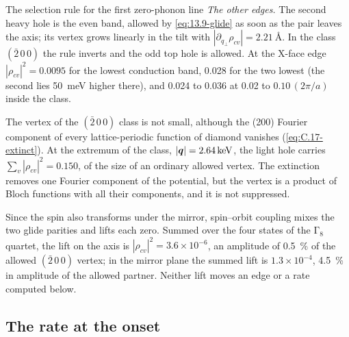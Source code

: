 \begin{workedexample}{The selection rule for the first zero-phonon line}
\emph{The other edges.} The second heavy hole is the even band, allowed by \cref{eq:13.9-glide} as soon as the pair leaves the axis; its vertex grows linearly in the tilt with $|\partial_{q_\perp}\rho_{cv}| = \SI{2.21}{\angstrom}$. In the class $(\bar2\,0\,0)$ the rule inverts and the odd top hole is allowed. At the X-face edge $|\rho_{cv}|^2 = 0.0095$ for the lowest conduction band, 0.028 for the two lowest (the second lies \SI{50}{meV} higher there), and 0.024 to 0.036 at 0.02 to $0.10\,(2\pi/a)$ inside the class.
\end{workedexample}

The vertex of the $(\bar2\,0\,0)$ class is not small, although the (200) Fourier component of every lattice-periodic function of diamond vanishes (\cref{eq:C.17-extinct}). At the extremum of the class, $|\bm{q}| = \SI{2.64}{keV}$, the light hole carries $\sum_v|\rho_{cv}|^2 = 0.150$, of the size of an ordinary allowed vertex. The extinction removes one Fourier component of the potential, but the vertex is a product of Bloch functions with all their components, and it is not suppressed.

Since the spin also transforms under the mirror, spin--orbit coupling mixes the two glide parities and lifts each zero. Summed over the four states of the $\mathrm{\Gamma}_8$ quartet, the lift on the axis is $|\rho_{cv}|^2 = 3.6\times10^{-6}$, an amplitude of \SI{0.5}{\percent} of the allowed $(\bar2\,0\,0)$ vertex; in the mirror plane the summed lift is $1.3\times10^{-4}$, \SI{4.5}{\percent} in amplitude of the allowed partner. Neither lift moves an edge or a rate computed below.

\subsection{The rate at the onset}\label{sec:13.9-onset}

